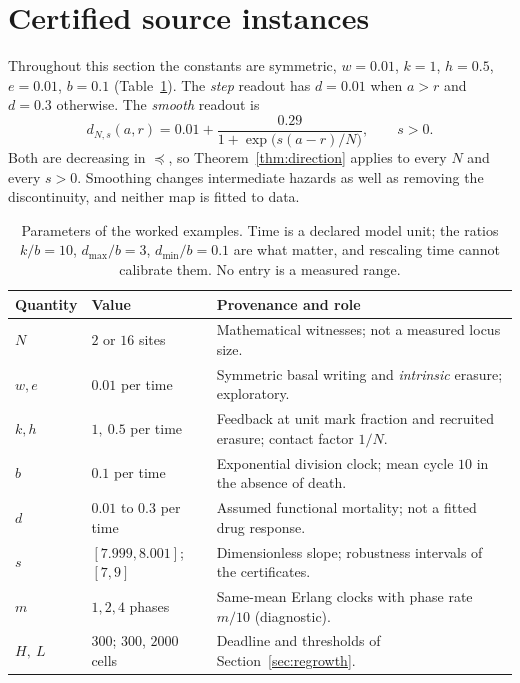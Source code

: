 \documentclass[11pt]{article}
\theoremstyle{remark}
\begin{document}
\section{Certified source instances}\label{sec:instances}

Throughout this section the constants are symmetric,
$w=0.01$, $k=1$, $h=0.5$, $e=0.01$, $b=0.1$ (Table~\ref{tab:param}). The
\emph{step} readout has $d=0.01$ when $a>r$ and $d=0.3$ otherwise. The
\emph{smooth} readout is
\begin{equation}\label{eq:smooth}
 d_{N,s}(a,r)=0.01+\frac{0.29}{1+\exp\bigl(s(a-r)/N\bigr)},\qquad s>0 .
\end{equation}
Both are decreasing in $\preceq$, so Theorem~\ref{thm:direction} applies to
every $N$ and every $s>0$. Smoothing changes intermediate hazards as well as
removing the discontinuity, and neither map is fitted to data.

\begin{table}[t]
\centering\small
\begin{tabular}{p{.13\linewidth}p{.20\linewidth}p{.57\linewidth}}
\toprule
Quantity & Value & Provenance and role\\\midrule
$N$ & $2$ or $16$ sites & Mathematical witnesses; not a measured locus size.\\
$w,e$ & $0.01$ per time & Symmetric basal writing and \emph{intrinsic} erasure; exploratory.\\
$k,h$ & $1,\ 0.5$ per time & Feedback at unit mark fraction and recruited erasure; contact factor $1/N$.\\
$b$ & $0.1$ per time & Exponential division clock; mean cycle $10$ in the absence of death.\\
$d$ & $0.01$ to $0.3$ per time & Assumed functional mortality; not a fitted drug response.\\
$s$ & $[7.999,8.001]$; $[7,9]$ & Dimensionless slope; robustness intervals of the certificates.\\
$m$ & $1,2,4$ phases & Same-mean Erlang clocks with phase rate $m/10$ (diagnostic).\\
$H,\ L$ & $300$; $300$, $2000$ cells & Deadline and thresholds of Section~\ref{sec:regrowth}.\\\bottomrule
\end{tabular}
\caption{Parameters of the worked examples. Time is a declared model unit;
the ratios $k/b=10$, $d_{\max}/b=3$, $d_{\min}/b=0.1$ are what matter, and
rescaling time cannot calibrate them. No entry is a measured range.}
\label{tab:param}
\end{table}
\end{document}
